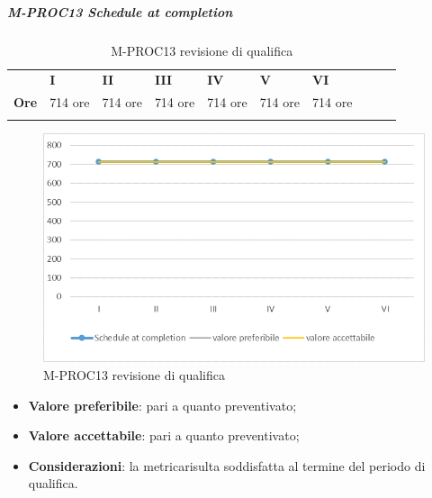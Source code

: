 \subparagraph{M-PROC13 Schedule at completion} \mbox{}
\begin{longtable}[H!] {						
		>{}p{15mm}  		
		>{}p{16mm}
		>{}p{16mm}		
		>{}p{16mm}		
		>{}p{16mm}		
		>{}p{16mm}		
		>{}p{16mm}
		>{}p{16mm}
		>{}p{16mm}
		>{}p{16mm}
	}
	\rowcolor{gray!50}
	\textbf{} & \textbf{I} & \textbf{II} & \textbf{III} & \textbf{IV} & \textbf{V} & \textbf{VI} \TBstrut \\ [2mm]
	\textbf{Ore} & 714 ore & 714 ore & 714 ore & 714 ore & 714 ore & 714 ore \TBstrut \\ [2mm]
	\rowcolor{white}
	\caption{M-PROC13 revisione di qualifica}
\end{longtable}
\begin{figure}[H] 	
	\includegraphics[width=\linewidth]{./img/grafici/RQ13.png}	
	\caption{M-PROC13 revisione di qualifica}	
\end{figure}
\begin{itemize}
	\item \textbf{Valore preferibile}: pari a quanto preventivato;
	\item \textbf{Valore accettabile}: pari a quanto preventivato;
	\item \textbf{Considerazioni}: la metrica\glosp risulta soddisfatta al termine del periodo di qualifica.
\end{itemize}

